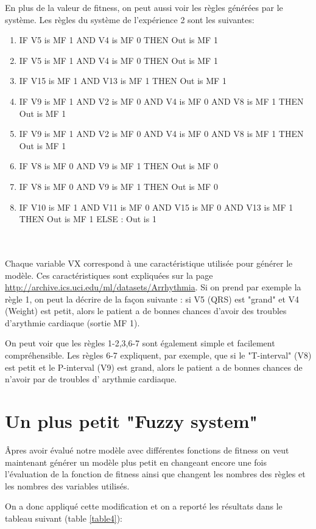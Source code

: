 En plus de la valeur de fitness, on peut aussi voir les règles générées par le système. Les règles du système de l'expérience 2 sont les suivantes:
\\
\begin{enumerate}
  \item IF V5 is MF 1 AND V4 is MF 0 THEN Out is MF 1
  \item IF V5 is MF 1 AND V4 is MF 0 THEN Out is MF 1
  \item IF V15 is MF 1 AND V13 is MF 1 THEN Out is MF 1
  \item IF V9 is MF 1 AND V2 is MF 0 AND V4 is MF 0 AND V8 is MF 1 THEN Out is MF 1
  \item IF V9 is MF 1 AND V2 is MF 0 AND V4 is MF 0 AND V8 is MF 1 THEN Out is MF 1
  \item IF V8 is MF 0 AND V9 is MF 1 THEN Out is MF 0
  \item IF V8 is MF 0 AND V9 is MF 1 THEN Out is MF 0
  \item IF V10 is MF 1 AND V11 is MF 0 AND V15 is MF 0 AND V13 is MF 1 THEN Out is MF 1 ELSE : Out is 1  
\end{enumerate}
\\\\
Chaque variable VX correspond à une caractéristique utilisée pour générer le modèle. Ces caractéristiques sont expliquées sur la page \url{http://archive.ics.uci.edu/ml/datasets/Arrhythmia}.
Si on prend par exemple la règle 1, on peut la décrire de la façon suivante : si V5 (QRS) est "grand" et V4 (Weight) est petit, alors le patient a de bonnes chances d'avoir des troubles d'arythmie cardiaque (sortie MF 1).

On peut voir que les règles 1-2,3,6-7 sont également simple et facilement compréhensible. 
Les règles 6-7 expliquent, par exemple, que si le "T-interval" (V8) est petit et le P-interval (V9) est grand, alors le patient a de bonnes chances de n'avoir par de troubles d' arythmie cardiaque.


\section*{Un plus petit "Fuzzy system"}
Âpres avoir évalué notre modèle avec différentes fonctions de fitness on veut maintenant générer un modèle plus petit en changeant encore une fois l'évaluation de la fonction de fitness ainsi que changent les nombres des règles et les nombres des variables utilisés.

On a donc appliqué cette modification et on a reporté les résultats dans le tableau suivant (table \ref{table4}):




